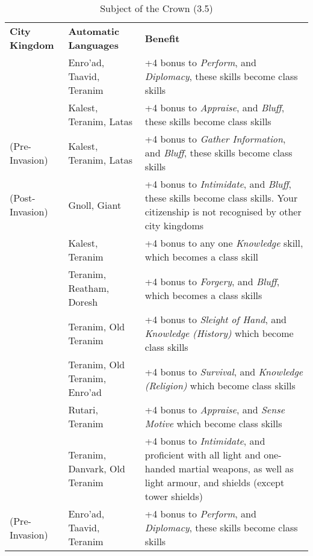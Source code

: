 \begin{table*}[!htb]
  \caption{Subject of the Crown (3.5)}
  \begin{tabular}{l p{5cm} p{7cm}}
    \textbf{City Kingdom}                    & \textbf{Automatic Languages} & \textbf{Benefit} \\
    \nameref{sec:Avenfjord}                  & Enro'ad, Taavid, Teranim     & +4 bonus to \emph{Perform}, and \emph{Diplomacy}, these skills become class skills \\
    \nameref{sec:El-Fayam}                   & Kalest, Teranim, Latas       & +4 bonus to \emph{Appraise}, and \emph{Bluff}, these skills become class skills \\
    \nameref{sec:Esmayar} (Pre-Invasion)     & Kalest, Teranim, Latas       & +4 bonus to \emph{Gather Information}, and \emph{Bluff}, these skills become class skills \\
    \nameref{sec:Esmayar} (Post-Invasion)    & Gnoll, Giant                 & +4 bonus to \emph{Intimidate}, and \emph{Bluff}, these skills become class skills. Your citizenship is not recognised by other city kingdoms \\
    \nameref{sec:Fes al-Bashir}              & Kalest, Teranim              & +4 bonus to any one \emph{Knowledge} skill, which becomes a class skill \\
    \nameref{sec:Forsby}                     & Teranim, Reatham, Doresh     & +4 bonus to \emph{Forgery}, and \emph{Bluff}, which becomes a class skills \\
    \nameref{sec:Helmarnock}                 & Teranim, Old Teranim         & +4 bonus to \emph{Sleight of Hand}, and \emph{Knowledge (History)} which become class skills \\
    \nameref{sec:Hraglund}                   & Teranim, Old Teranim, Enro'ad& +4 bonus to \emph{Survival}, and \emph{Knowledge (Religion)} which become class skills \\
    \nameref{sec:Kesmar}                     & Rutari, Teranim              & +4 bonus to \emph{Appraise}, and \emph{Sense Motive} which become class skills \\
    \nameref{sec:Morkan}                     & Teranim, Danvark, Old Teranim& +4 bonus to \emph{Intimidate}, and proficient with all light and one-handed martial weapons, as well as light armour, and shields (except tower shields) \\
    \nameref{sec:Nen-Hilith} (Pre-Invasion)  & Enro'ad, Taavid, Teranim     & +4 bonus to \emph{Perform}, and \emph{Diplomacy}, these skills become class skills \\

\end{tabular}
\end{table*}
